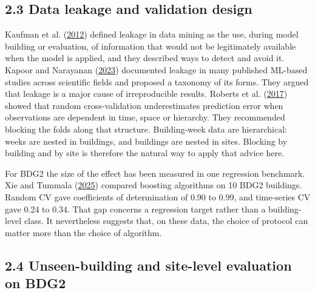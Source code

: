 \documentclass[
  10pt,
]{article}
\begin{document}
\hypertarget{data-leakage-and-validation-design}{%
\subsection{2.3 Data leakage and validation
design}\label{data-leakage-and-validation-design}}

Kaufman et al. (\protect\hyperlink{ref-kaufman2012}{2012}) defined
leakage in data mining as the use, during model building or evaluation,
of information that would not be legitimately available when the model
is applied, and they described ways to detect and avoid it. Kapoor and
Narayanan (\protect\hyperlink{ref-kapoor2023}{2023}) documented leakage
in many published ML-based studies across scientific fields and proposed
a taxonomy of its forms. They argued that leakage is a major cause of
irreproducible results. Roberts et al.
(\protect\hyperlink{ref-roberts2017}{2017}) showed that random
cross-validation underestimates prediction error when observations are
dependent in time, space or hierarchy. They recommended blocking the
folds along that structure. Building-week data are hierarchical: weeks
are nested in buildings, and buildings are nested in sites. Blocking by
building and by site is therefore the natural way to apply that advice
here.

For BDG2 the size of the effect has been measured in one regression
benchmark. Xie and Tummala (\protect\hyperlink{ref-xie2025}{2025})
compared boosting algorithms on 10 BDG2 buildings. Random CV gave
coefficients of determination of 0.90 to 0.99, and time-series CV gave
0.24 to 0.34. That gap concerns a regression target rather than a
building-level class. It nevertheless suggests that, on these data, the
choice of protocol can matter more than the choice of algorithm.

\hypertarget{unseen-building-and-site-level-evaluation-on-bdg2}{%
\subsection{2.4 Unseen-building and site-level evaluation on
BDG2}\label{unseen-building-and-site-level-evaluation-on-bdg2}}
\end{document}

